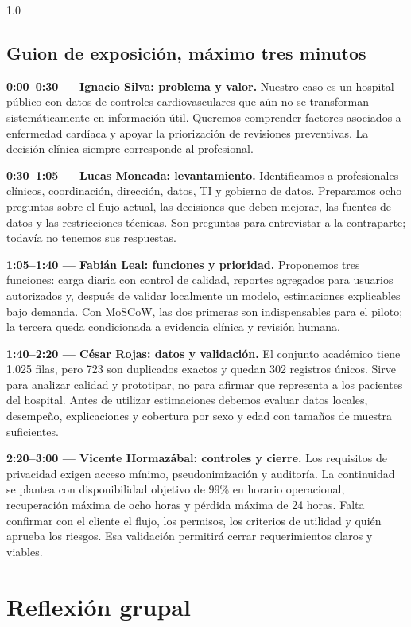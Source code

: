 \documentclass[12pt,a4paper]{article}
\begin{document}
\clearpage
\begin{spacing}{1.0}
\subsection{Guion de exposición, máximo tres minutos}

\textbf{0:00--0:30 --- Ignacio Silva: problema y valor.} Nuestro caso es un hospital público con datos de controles cardiovasculares que aún no se transforman sistemáticamente en información útil. Queremos comprender factores asociados a enfermedad cardíaca y apoyar la priorización de revisiones preventivas. La decisión clínica siempre corresponde al profesional.

\textbf{0:30--1:05 --- Lucas Moncada: levantamiento.} Identificamos a profesionales clínicos, coordinación, dirección, datos, TI y gobierno de datos. Preparamos ocho preguntas sobre el flujo actual, las decisiones que deben mejorar, las fuentes de datos y las restricciones técnicas. Son preguntas para entrevistar a la contraparte; todavía no tenemos sus respuestas.

\textbf{1:05--1:40 --- Fabián Leal: funciones y prioridad.} Proponemos tres funciones: carga diaria con control de calidad, reportes agregados para usuarios autorizados y, después de validar localmente un modelo, estimaciones explicables bajo demanda. Con MoSCoW, las dos primeras son indispensables para el piloto; la tercera queda condicionada a evidencia clínica y revisión humana.

\textbf{1:40--2:20 --- César Rojas: datos y validación.} El conjunto académico tiene 1.025 filas, pero 723 son duplicados exactos y quedan 302 registros únicos. Sirve para analizar calidad y prototipar, no para afirmar que representa a los pacientes del hospital. Antes de utilizar estimaciones debemos evaluar datos locales, desempeño, explicaciones y cobertura por sexo y edad con tamaños de muestra suficientes.

\textbf{2:20--3:00 --- Vicente Hormazábal: controles y cierre.} Los requisitos de privacidad exigen acceso mínimo, pseudonimización y auditoría. La continuidad se plantea con disponibilidad objetivo de 99\% en horario operacional, recuperación máxima de ocho horas y pérdida máxima de 24 horas. Falta confirmar con el cliente el flujo, los permisos, los criterios de utilidad y quién aprueba los riesgos. Esa validación permitirá cerrar requerimientos claros y viables.

\section{Reflexión grupal}


\end{spacing}
\end{document}
